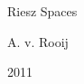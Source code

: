 \documentclass[main.tex]{subfiles}
\begin{document}
\thispagestyle{empty}
\phantom{top}
\vfill
\noindent
\begin{minipage}{\textwidth}
\begin{center}
{\Huge Riesz Spaces }
\end{center}
\vspace{1cm}
\begin{center}
{\LARGE A. v. Rooij}
\end{center}
\vspace{.5cm}
\begin{center}
{\Large 2011}
\end{center}
\end{minipage}
\vfill
\vfill
\vfill
\vfill
\phantom{bottom}
\newpage
\end{document}
